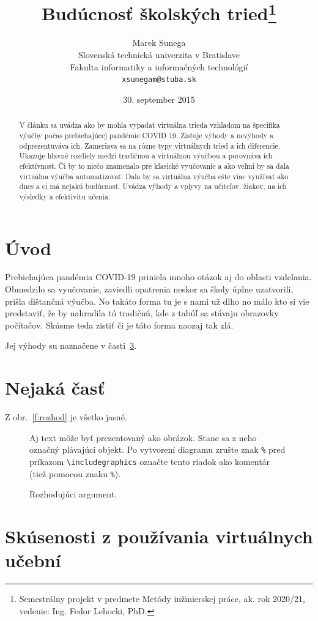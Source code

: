 \documentclass[10pt,twoside,slovak,a4paper]{article}
\title{Budúcnosť školských tried\thanks{Semestrálny projekt v predmete Metódy inžinierskej práce, ak. rok 2020/21, vedenie: Ing. Fedor Lehocki, PhD.}} %
\author{Marek Sunega\\[2pt]
	{\small Slovenská technická univerzita v Bratislave}\\
	{\small Fakulta informatiky a informačných technológií}\\
	{\small \texttt{xsunegam@stuba.sk}}
	}
\date{\small 30. september 2015} %
\begin{document}
\maketitle

\begin{abstract}
    V článku sa uvádza ako by mohla vypadať virtuálna trieda vzhľadom na špecifika výučby počas 
	prebiehajúcej pandémie COVID 19. Zisťuje výhody a nevýhody a odprezentuváva ich. Zameriava 
	sa na rôzne typy virtuálnych tried a ich diferencie. Ukazuje hlavné rozdiely medzi tradičnou 
	a virtuálnou výučbou a porovnáva ich efektívnosť. Či by to niečo znamenalo pre klasické vyučovanie 
	a ako veľmi by sa dala virtuálna výučba automatizovať. Dala by sa virtuálna výučba ešte viac 
	využívať ako dnes a ci má nejakú budúcnosť. Uvádza výhody a vplyvy na učiteľov, žiakov, na ich 
	výsledky a efektivitu učenia.
\end{abstract}



\section{Úvod}
Prebiehajúca pandémia COVID-19 priniela mnoho otázok aj do oblasti vzdelania. Obmedzilo sa vyučovanie, zaviedli 
opatrenia neskor sa školy úplne uzatvorili, prišla dištančná výučba. No takáto forma tu je s nami už dlho no 
málo kto si vie predstaviť, že by nahradila tú tradičnú, kde z tabúľ sa stávaju obrazovky počítačov. Skúsme teda zistiť
či je táto forma naozaj tak zlá.

Jej výhody su naznačene v časti~\ref{3}.



\section{Nejaká časť} \label{nejaka}

Z obr.~\ref{f:rozhod} je všetko jasné. 

\begin{figure}[tbh]
\centering
Aj text môže byť prezentovaný ako obrázok. Stane sa z neho označný plávajúci objekt. Po vytvorení diagramu zrušte znak \texttt{\%} pred príkazom \verb|\includegraphics| označte tento riadok ako komentár (tiež pomocou znaku \texttt{\%}).
\caption{Rozhodujúci argument.}
\end{figure}



\section{Skúsenosti z používania virtuálnych učební} \label{3}
\end{document}
